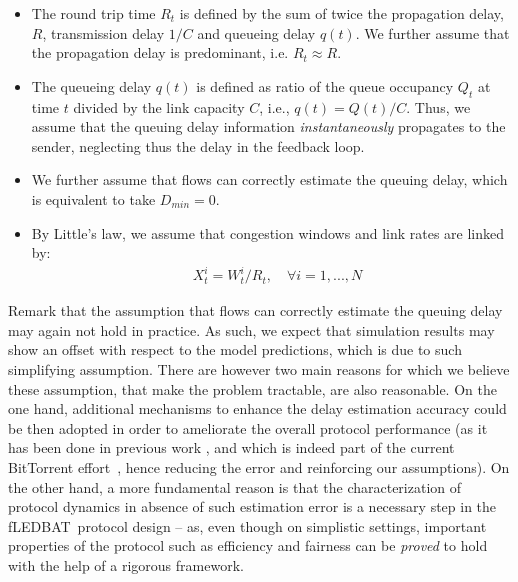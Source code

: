 \documentclass[conference]{IEEEtran}
\newcommand{\fledbat}[0]{fLEDBAT}
\begin{document}
\begin{itemize}
  \item The round trip time $R_t$ is defined by the sum of twice the propagation delay, $R$, transmission delay $1/C$ and queueing delay $q(t)$.
  We further assume that the propagation delay is predominant, i.e. $R_t\approx R$.
   \item The queueing delay $q(t)$ is defined as ratio of the queue occupancy $Q_t$ at time $t$ divided by the link capacity $C$, i.e.,   $q(t)=Q(t)/C$. Thus, we assume that the queuing delay information \emph{instantaneously} propagates to the sender, neglecting thus the delay in the feedback loop.
\item We further assume that flows can correctly estimate the queuing delay, which is equivalent to take $D_{min}=0$.
  \item By Little's law, we assume that congestion windows and link rates are linked by:
\begin{align}
   &X^i_t= W^i_t/R_t, \quad \forall i=1,...,N
\end{align}
\end{itemize}

Remark that the assumption that flows can correctly estimate the queuing delay may again not hold in practice.
As such, we expect that simulation results may show an offset with respect to the model predictions, which is due to such simplifying assumption.
There are however two main reasons for which we believe these assumption, that make the problem tractable, are also reasonable.
On the one hand, additional mechanisms to enhance the delay estimation accuracy could be then adopted in order to ameliorate the overall protocol performance (as it has been done in previous work \cite{tcp_lp}, and which is indeed part of the current BitTorrent effort~\cite{cohen10iptps}, hence reducing the error and reinforcing our assumptions). On the other hand, a more fundamental reason is that the characterization of protocol dynamics in absence of such estimation error is a necessary step in the \fledbat\ protocol design -- as, even though on simplistic settings,  important properties of the protocol such as efficiency and fairness can be \emph{proved} to hold with the help of a rigorous framework.
\end{document}
